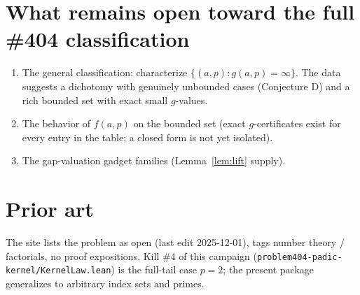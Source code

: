 \documentclass{article}
\begin{document}
\section{What remains open toward the full \#404 classification}

\begin{enumerate}
\item The general classification: characterize $\{(a,p) : g(a,p) = \infty\}$.
The data suggests a dichotomy with genuinely unbounded cases (Conjecture D)
and a rich bounded set with exact small $g$-values.
\item The behavior of $f(a,p)$ on the bounded set (exact $g$-certificates
exist for every entry in the table; a closed form is not yet isolated).
\item The gap-valuation gadget families (Lemma~\ref{lem:lift} supply).
\end{enumerate}

\section{Prior art}
The site lists the problem as open (last edit 2025-12-01), tags number
theory / factorials, no proof expositions.  Kill \#4 of this campaign
(\texttt{problem404-padic-kernel/KernelLaw.lean}) is the full-tail case
$p = 2$; the present package generalizes to arbitrary index sets and primes.
\end{document}
